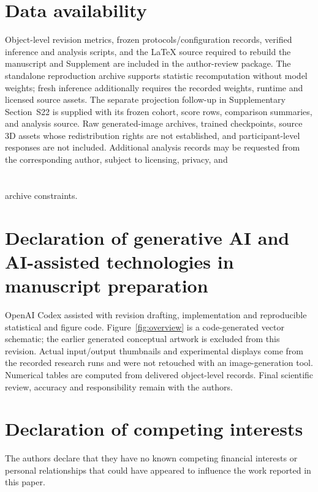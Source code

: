 \documentclass[times,twocolumn,final]{elsarticle}
\providecommand{\DIFadd}[1]{{\protect\color{blue} \sf #1}} %
\providecommand{\DIFaddbegin}{} %
\providecommand{\DIFaddend}{} %
\begin{document}
  \DIFaddbegin \section*{\DIFadd{Data availability}}
\DIFaddend 

  \DIFaddbegin \DIFadd{Object-level revision metrics, frozen protocols/configuration records, verified inference and analysis scripts, and the LaTeX source required to rebuild the manuscript and Supplement are included in the author-review package. The standalone reproduction archive supports statistic recomputation without model weights; fresh inference additionally requires the recorded weights, runtime and licensed source assets. The separate projection follow-up in Supplementary Section~S22 is supplied with its frozen cohort, score rows, comparison summaries, and analysis source. Raw generated-image archives, trained checkpoints, source 3D assets whose redistribution rights are not established, and participant-level responses are not included. Additional analysis records may be requested from the corresponding author, subject to licensing, privacy, }\DIFaddend and  

\section*{}
 \DIFaddbegin \DIFadd{archive constraints.
}\DIFaddend 

  \DIFaddbegin \section*{\DIFadd{Declaration of generative AI and AI-assisted technologies in manuscript preparation}}
\DIFadd{OpenAI Codex assisted with revision drafting, implementation and reproducible statistical and figure code. Figure~\ref{fig:overview} is a code-generated vector schematic; the earlier generated conceptual artwork is excluded from this revision. Actual input/output thumbnails and experimental displays come from the recorded research runs and were not retouched with an image-generation tool. Numerical tables are computed from delivered object-level records. Final scientific review, accuracy and responsibility remain with the authors}\DIFaddend .

\section*{Declaration of competing interests}

The authors declare that they have no known competing financial interests or personal relationships that could have appeared to influence the work reported in this paper.
\end{document}
